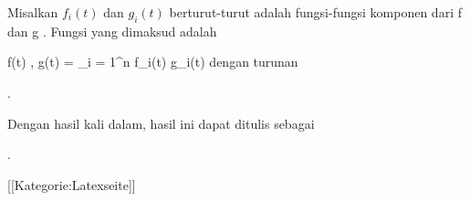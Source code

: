 
Misalkan $f_i(t)$ dan $g_i(t)$ berturut-turut adalah fungsi-fungsi komponen dari
\mathkor {} {f} {dan} {g} {.}
Fungsi yang dimaksud adalah

\mavergleichskettedisp
{\vergleichskette
{  \left\langle f(t) , g(t)  \right\rangle
}
{ =} { \sum_{i = 1}^n  f_i(t) g_i(t)
}
{ } {
}
{ } {
}
{ } {
}
}
{}{}{}
dengan turunan
 {} {}

 { . }

Dengan hasil kali dalam, hasil ini dapat ditulis sebagai

 { . }

 [[Kategorie:Latexseite]]
